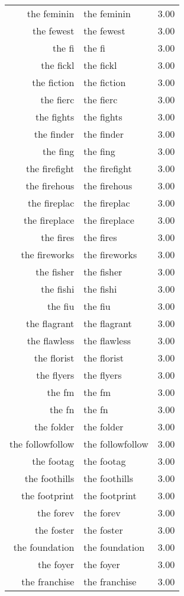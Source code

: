 \begin{table}[ht]
\begin{tabular}{rlr}
  the feminin & the feminin & 3.00 \\ 
  the fewest & the fewest & 3.00 \\ 
  the fi & the fi & 3.00 \\ 
  the fickl & the fickl & 3.00 \\ 
  the fiction & the fiction & 3.00 \\ 
  the fierc & the fierc & 3.00 \\ 
  the fights & the fights & 3.00 \\ 
  the finder & the finder & 3.00 \\ 
  the fing & the fing & 3.00 \\ 
  the firefight & the firefight & 3.00 \\ 
  the firehous & the firehous & 3.00 \\ 
  the fireplac & the fireplac & 3.00 \\ 
  the fireplace & the fireplace & 3.00 \\ 
  the fires & the fires & 3.00 \\ 
  the fireworks & the fireworks & 3.00 \\ 
  the fisher & the fisher & 3.00 \\ 
  the fishi & the fishi & 3.00 \\ 
  the fiu & the fiu & 3.00 \\ 
  the flagrant & the flagrant & 3.00 \\ 
  the flawless & the flawless & 3.00 \\ 
  the florist & the florist & 3.00 \\ 
  the flyers & the flyers & 3.00 \\ 
  the fm & the fm & 3.00 \\ 
  the fn & the fn & 3.00 \\ 
  the folder & the folder & 3.00 \\ 
  the followfollow & the followfollow & 3.00 \\ 
  the footag & the footag & 3.00 \\ 
  the foothills & the foothills & 3.00 \\ 
  the footprint & the footprint & 3.00 \\ 
  the forev & the forev & 3.00 \\ 
  the foster & the foster & 3.00 \\ 
  the foundation & the foundation & 3.00 \\ 
  the foyer & the foyer & 3.00 \\ 
  the franchise & the franchise & 3.00 \\ 

\end{tabular}
\end{table}
